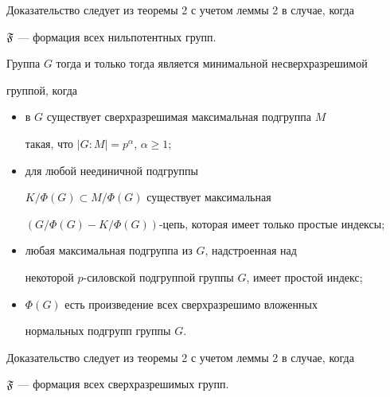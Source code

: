 Доказательство следует из теоремы 2 с учетом леммы 2 в случае, когда


$\frak F$ --- формация всех нильпотентных групп.





\begin{cor}


Группа $G$ тогда и только тогда является минимальной несверхразрешимой


группой, когда


\begin{itemize}


\item[1)] в $G$ существует сверхразрешимая максимальная подгруппа $M$


такая, что $|G{:}M|=p^\alpha$, $\alpha\ge 1;$


\item[2)] для любой неединичной подгруппы


$K/\Phi(G)\subset M/\Phi(G)$ существует максимальная\linebreak


$(G/\Phi(G)-K/\Phi(G))$-цепь, которая имеет только простые индексы;


\item[3)] любая максимальная подгруппа из $G$, надстроенная над


некоторой $p$-силовской подгруппой группы $G$, имеет простой индекс;


\item[4)] $\Phi(G)$ есть произведение всех сверхразрешимо вложенных


нормальных подгрупп группы $G$.


\end{itemize}


\end{cor}





Доказательство следует из теоремы 2 с учетом леммы 2 в случае, когда


$\frak F$ --- формация всех сверхразрешимых групп.





